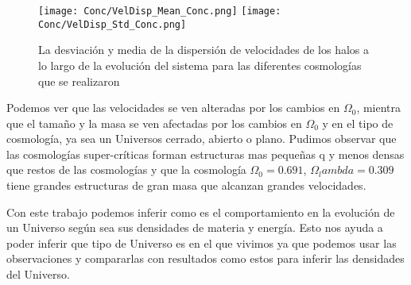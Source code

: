 \begin{figure}
      \centering
      \texttt{[image: Conc/VelDisp\_Mean\_Conc.png]}
      \texttt{[image: Conc/VelDisp\_Std\_Conc.png]}
      \caption[Evolución de la desviación y media de la dispersión de velocidades los halos para todas las cosmologías]{La desviación y media de la dispersión de velocidades de los halos a lo largo de la evolución del sistema para las diferentes cosmologías que se realizaron}
      \label{fig:Conc_VelDisp}
\end{figure}

Podemos ver que las velocidades se ven alteradas por los cambios en $\Omega_0$, mientra que el tamaño y la masa se ven afectadas por los cambios en $\Omega_0$ y en el tipo de cosmología, ya sea un Universos cerrado, abierto o plano. Pudimos observar que las cosmologías super-críticas forman estructuras mas pequeñas q y menos densas que restos de las cosmologías y que la cosmología $\Omega_0 = 0.691$, $\Omega_lambda = 0.309$ tiene grandes estructuras de gran masa que alcanzan grandes velocidades.

Con este trabajo podemos inferir como es el comportamiento en la evolución de un Universo según sea sus densidades de materia y energía. Esto nos ayuda a poder inferir que tipo de Universo es en el que vivimos ya que podemos usar las observaciones y compararlas con resultados como estos para inferir las densidades del Universo.
 

\lhead[\fancyplain{}{}]%
      {\fancyplain{}{\bfseries\rightmark}}
